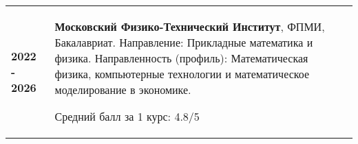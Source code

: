 \begin{tabularx}{\linewidth}{@{}l X@{}}	
  
  \textbf{2022 - 2026} & \textbf{Московский Физико-Технический Институт}, ФПМИ, Бакалавриат. Направление: Прикладные математика и физика. 
  Направленность (профиль): Математическая физика, компьютерные технологии и математическое моделирование в экономике.
  
  \normalsize Средний балл за 1 курс: 4.8/5 \\ 
\end{tabularx}